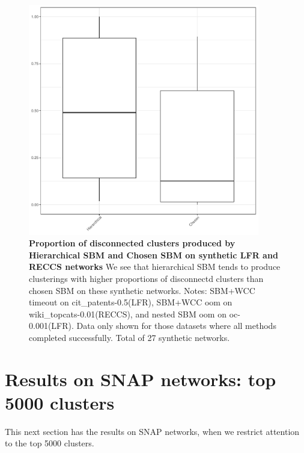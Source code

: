 \documentclass[aps,pre,superscriptaddress]{article}
\begin{document}
\begin{figure}[!htpb]
	\centering
	\includegraphics[width=0.9\textwidth]{figures/conn_box.pdf}
	\caption[]{\textbf{Proportion of disconnected clusters produced by Hierarchical SBM and Chosen SBM on synthetic LFR and RECCS networks}  We see that hierarchical SBM tends to produce clusterings with higher proportions of disconnectd clusters than chosen SBM on these synthetic networks. Notes: SBM+WCC timeout on cit\_patents-0.5(LFR), SBM+WCC oom on wiki\_topcats-0.01(RECCS), and nested SBM oom on oc-0.001(LFR). Data only shown for those datasets where all methods completed successfully. Total of 27 synthetic networks.}
	\label{fig:synthetic-connectivity}
\end{figure}

\clearpage
\section{Results on SNAP networks: top 5000 clusters}

This next section has the results on SNAP networks, when we restrict attention to the top 5000 clusters.
\end{document}
